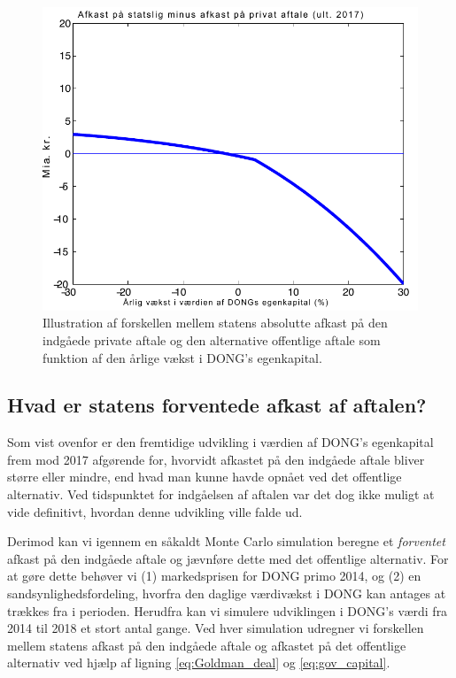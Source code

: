 \documentclass{article}
\begin{document}
\begin{figure}[t]
\caption{Illustration af forskellen mellem statens absolutte afkast p\aa{} den indg\aa{}ede private aftale og den alternative offentlige aftale som funktion af den \aa{}rlige v\ae{}kst i DONG's egenkapital. }
\label{fig:comp}
\centerline{\includegraphics[scale=0.8, trim=0mm 0mm 0mm 0mm, clip]{../matlab/figs/private_less_public_deal_guan.pdf}}
\end{figure}


\subsection{Hvad er statens forventede afkast af aftalen?}

Som vist ovenfor er den fremtidige udvikling i værdien af DONG's egenkapital frem mod 2017 afgørende for, hvorvidt afkastet på den indgåede aftale bliver større eller mindre, end hvad man kunne havde opnået ved det offentlige alternativ. Ved tidspunktet for indgåelsen af aftalen var det dog ikke muligt at vide definitivt, hvordan denne udvikling ville falde ud. 

Derimod kan vi igennem en såkaldt Monte Carlo simulation beregne et \emph{forventet} afkast på den indgåede aftale og jævnføre dette med det offentlige alternativ. For at gøre dette behøver vi (1) markedsprisen for DONG primo 2014, og (2) en sandsynlighedsfordeling, hvorfra den daglige værdivækst i DONG kan antages at trækkes fra i perioden. Herudfra kan vi simulere udviklingen i DONG's værdi fra 2014 til 2018 et stort antal gange. Ved hver simulation udregner vi forskellen mellem statens afkast på den indgåede aftale og afkastet på det offentlige alternativ ved hjælp af ligning \eqref{eq:Goldman_deal} og \eqref{eq:gov_capital}.
\end{document}
